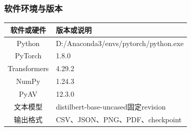 \documentclass{gmcmthesis}
\begin{document}
\begin{appendices}
\subsubsection{软件环境与版本}
\begin{center}
\begin{tabularx}{0.95\textwidth}{cY}
\toprule 软件或硬件 & 版本或说明 \\
\midrule
Python & D:/Anaconda3/envs/pytorch/python.exe \\
PyTorch & 1.8.0 \\
Transformers & 4.29.2 \\
NumPy & 1.24.3 \\
PyAV & 12.3.0 \\
文本模型 & distilbert-base-uncased固定revision \\
输出格式 & CSV、JSON、PNG、PDF、checkpoint \\
\bottomrule
\end{tabularx}
\end{center}

\end{appendices}
\end{document}
